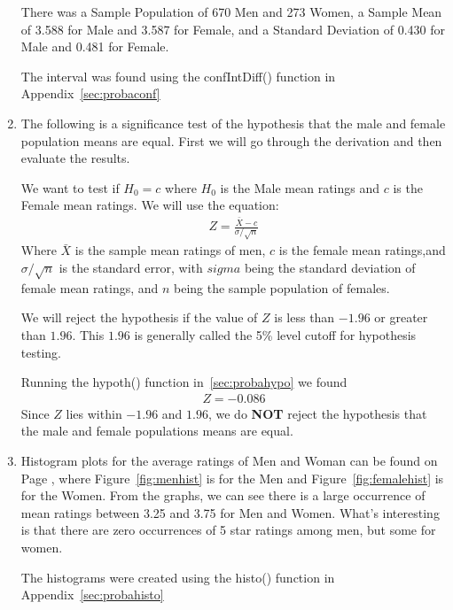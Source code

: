 \documentclass[11pt]{article}  %
\begin{document}
\begin{enumerate}
    There was a Sample Population of 670 Men and 273 Women, a Sample Mean of 3.588 for Male and 3.587 for Female, and a Standard Deviation of 0.430 for Male and 0.481 for Female.
    
    The interval was found using the confIntDiff() function in Appendix~\ref{sec:probaconf}
    
    \item The following is a significance test of the hypothesis that the male and female population means are equal. First we will go through the derivation and then evaluate the results.
    
    We want to test if $H_0 = c$ where $H_0$ is the Male mean ratings and $c$ is the Female mean ratings. We will use the equation:
    \begin{align*}
        Z = \frac{\bar{X} - c}{\sigma / \sqrt{n}}
    \end{align*}
    Where $\bar{X}$ is the sample mean ratings of men, $c$ is the female mean ratings,and $\sigma / \sqrt{n}$ is the standard error, with $sigma$ being the standard deviation of female mean ratings, and $n$ being the sample population of females.

    We will reject the hypothesis if the value of $Z$ is less than $-1.96$ or greater than $1.96$. This $1.96$ is generally called the 5\% level cutoff for hypothesis testing.
    
    Running the hypoth() function in~\ref{sec:probahypo} we found
    \begin{align*}
        Z = -0.086
    \end{align*}
    Since $Z$ lies within $-1.96$ and $1.96$, we do \textbf{NOT} reject the hypothesis that the male and female populations means are equal.

    \item Histogram plots for the average ratings of Men and Woman can be found on Page \pageref{fig:menhist}, where Figure~\ref{fig:menhist} is for the Men and Figure~\ref{fig:femalehist} is for the Women. From the graphs, we can see there is a large occurrence of mean ratings between 3.25 and 3.75  for Men and Women. What's interesting is that there are zero occurrences of 5 star ratings among men, but some for women.
    
    
    The histograms were created using the histo() function in Appendix~\ref{sec:probahisto}
    


\end{enumerate}
\end{document}
